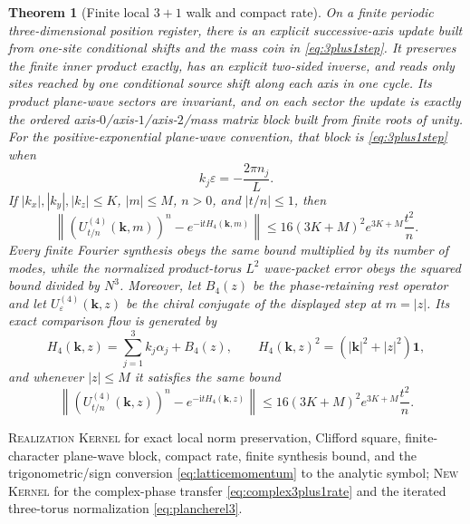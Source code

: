\documentclass[11pt]{article}
\newcommand{\Kernel}{\textcolor{kernelcolor}{\textsc{Kernel}}}
\newcommand{\NewResult}{\textsc{New}}
\newcommand{\Realization}{\textsc{Realization}}
\newcommand{\ii}{\mathrm{i}}
\newcommand{\id}{\mathbf{1}}
\newcommand{\norm}[1]{\left\lVert #1\right\rVert}
\newtheorem{theorem}{Theorem}[section]
\begin{document}
\begin{theorem}[Finite local $3+1$ walk and compact rate]
\label{thm:3plus1rate}
On a finite periodic three-dimensional position register, there is an explicit
successive-axis update built from one-site conditional shifts and the mass coin
in \eqref{eq:3plus1step}.  It preserves the finite inner product exactly, has
an explicit two-sided inverse, and reads only sites reached by one conditional
source shift along each axis in one cycle.  Its product plane-wave sectors are
invariant, and on each sector the update is
exactly the ordered axis-$0$/axis-$1$/axis-$2$/mass matrix block built from
finite roots of unity.  For the positive-exponential plane-wave convention,
that block is \eqref{eq:3plus1step} when
\begin{equation}\label{eq:latticemomentum}
 k_j\varepsilon=-\frac{2\pi n_j}{L}.
\end{equation}
If
$|k_x|,|k_y|,|k_z|\leq K$, $|m|\leq M$, $n>0$, and $|t/n|\leq1$, then
\begin{equation}\label{eq:3plus1ratebound}
 \norm{\left(U^{(4)}_{t/n}(\mathbf k,m)\right)^n
       -e^{-\ii tH_4(\mathbf k,m)}}
 \leq 16(3K+M)^2e^{3K+M}\frac{t^2}{n}.
\end{equation}
Every finite Fourier synthesis obeys the same bound multiplied by its number
of modes, while the normalized product-torus $L^2$ wave-packet error obeys
the squared bound divided by $N^3$.  Moreover, let $B_4(z)$ be the
phase-retaining rest operator and let $U^{(4)}_\varepsilon(\mathbf k,z)$ be the
chiral conjugate of the displayed step at $m=|z|$.  Its exact comparison flow
is generated by
\[
 H_4(\mathbf k,z)=\sum_{j=1}^3k_j\alpha_j+B_4(z),
 \qquad
 H_4(\mathbf k,z)^2=(|\mathbf k|^2+|z|^2)\id,
\]
and whenever $|z|\leq M$ it satisfies the same bound
\begin{equation}\label{eq:complex3plus1rate}
 \norm{\left(U^{(4)}_{t/n}(\mathbf k,z)\right)^n
       -e^{-\ii tH_4(\mathbf k,z)}}
 \leq 16(3K+M)^2e^{3K+M}\frac{t^2}{n}.
\end{equation}
\end{theorem}
\noindent\Realization{} \Kernel{} for exact local norm preservation, Clifford
square, finite-character plane-wave block, compact rate, finite synthesis
bound, and the trigonometric/sign conversion
\eqref{eq:latticemomentum} to the analytic symbol; \NewResult{} \Kernel{} for
the complex-phase transfer \eqref{eq:complex3plus1rate} and the iterated
three-torus normalization \eqref{eq:plancherel3}.
\end{document}
